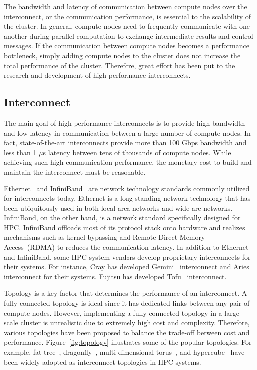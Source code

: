 The bandwidth and latency of communication between compute nodes over the
interconnect, or the communication performance, is essential to the
scalability of the cluster. In general, compute nodes need to frequently
communicate with one another during parallel computation to exchange
intermediate results and control messages. If the communication between
compute nodes becomes a performance bottleneck, simply adding compute nodes to
the cluster does not increase the total performance of the cluster. Therefore,
great effort has been put to the research and development of high-performance
interconnects.

\subsection{Interconnect}\label{sec:i-interconnect}

The main goal of high-performance interconnects is to provide high bandwidth
and low latency in communication between a large number of compute nodes.
In fact, state-of-the-art interconnects provide more than 100 Gbps bandwidth
and less than 1 $\mu$s latency between tens of thousands of compute nodes.
While achieving such high communication performance, the monetary cost to
build and maintain the interconnect must be reasonable.

Ethernet~\autocite{Trowbridge2007} and InfiniBand~\autocite{Buyya2009} are
network technology standards commonly utilized for interconnects today.
Ethernet is a long-standing network technology that has been ubiquitously used
in both local area networks and wide are networks. InfiniBand, on the other
hand, is a network standard specifically designed for HPC\@. InfiniBand
offloads most of its protocol stack onto hardware and realizes mechanisms such
as kernel bypassing and Remote Direct Memory Access~(RDMA) to reduces the
communication latency. In addition to Ethernet and InfiniBand, some HPC system
vendors develop proprietary interconnects for their systems. For instance,
Cray has developed Gemini~\autocite{Alverson2010} interconnect and
Aries~\autocite{Faanes2012} interconnect for their systems. Fujitsu has
developed Tofu~\autocite{Ajima2012} interconnect.

Topology is a key factor that determines the performance of an interconnect.
A fully-connected topology is ideal since it has dedicated links between any
pair of compute nodes. However, implementing a fully-connected topology in a
large scale cluster is unrealistic due to extremely high cost and complexity.
Therefore, various topologies have been proposed to balance the trade-off
between cost and performance. Figure~\ref{fig:topology} illustrates some of
the popular topologies. For example, fat-tree~\autocite{Leiserson1985},
dragonfly~\autocite{Kim2008}, multi-dimensional
torus~\autocite{Alverson2010,Ajima2012}, and hypercube~\autocite{Dally2003} have
been widely adopted as interconnect topologies in HPC systems.

